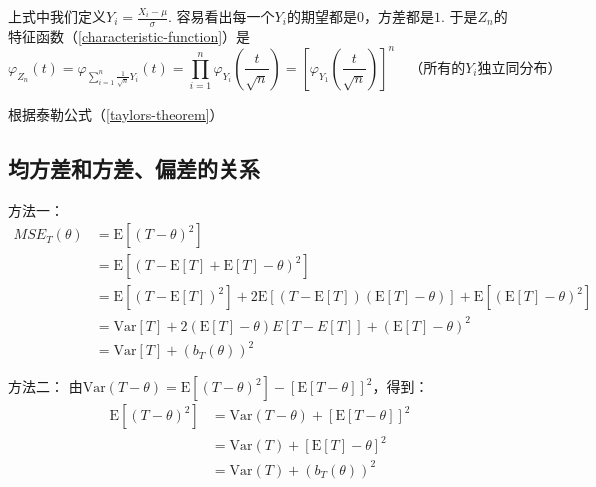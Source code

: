 \documentclass[UTF8]{ctexbook}
\begin{document}
上式中我们定义$Y_i=\frac{X_i-\mu}{\sigma}$. 容易看出每一个$Y_i$的期望都是$0$，方差都是$1$. 于是$Z_n$的特征函数（\ref{characteristic-function}）是
\[
	\varphi_{Z_n}(t)=\varphi_{\sum_{i=1}^n\frac{1}{\sqrt n}Y_i}(t)=\prod_{i=1}^n\varphi_{Y_i}\left(\frac{t}{\sqrt n}\right)=\left[\varphi_{Y_1}\left(\frac{t}{\sqrt n}\right)\right]^n\quad\text{（所有的$Y_i$独立同分布）}
\]

根据泰勒公式（\ref{taylors-theorem}）
\subsection{均方差和方差、偏差的关系}
\label{proof1}
方法一：
\begin{align*}
	MSE_T(\theta)&=\mathrm{E}[(T-\theta)^2] \\
	&=\mathrm{E}[(T-\mathrm{E}[T]+\mathrm{E}[T]-\theta)^2]\\
	&=\mathrm{E}[(T-\mathrm{E}[T])^2]+2\mathrm{E}[(T-\mathrm{E}[T])(\mathrm{E}[T]-\theta)]+\mathrm{E}[(\mathrm{E}[T]-\theta)^2]\\
	&=\mathrm{Var}[T]+2(\mathrm{E}[T]-\theta)E[T-E[T]]+(\mathrm{E}[T]-\theta)^2\\
	&=\mathrm{Var}[T]+(b_T(\theta))^2
\end{align*}

方法二：
由$\mathrm{Var}(T-\theta)=\mathrm{E}[(T-\theta)^2]-[\mathrm{E}[T-\theta]]^2$，得到：
\begin{align*}
	\mathrm{E}[(T-\theta)^2]&=\mathrm{Var}(T-\theta)+[\mathrm{E}[T-\theta]]^2\\
	&=\mathrm{Var}(T)+[\mathrm{E}[T]-\theta]^2\\
	&=\mathrm{Var}(T)+(b_T(\theta))^2
\end{align*}
\end{document}
